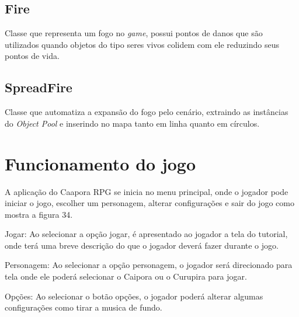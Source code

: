 \subsection{Fire}
Classe que representa um fogo no \textit{game}, possui pontos de danos que são utilizados quando objetos do tipo seres vivos colidem com ele reduzindo seus pontos de vida.


\subsection{SpreadFire}
Classe que automatiza a expansão do fogo pelo cenário, extraindo as instâncias do \textit{Object Pool} e inserindo no mapa tanto em linha quanto em círculos.

\section{Funcionamento do jogo}
A aplicação do Caapora RPG se inicia no menu principal, onde o jogador pode iniciar o jogo, escolher um personagem, alterar configurações e sair do jogo como mostra a figura 34.

\pagebreak
\begin{figure}[h!]
		\centering
	\end{figure}

Jogar: Ao selecionar a opção jogar, é apresentado ao jogador a tela do tutorial, onde terá uma breve descrição do que o jogador deverá fazer durante o jogo.

Personagem: Ao selecionar a opção personagem, o jogador será direcionado para tela onde ele poderá selecionar o Caipora ou o Curupira para jogar.

Opções: Ao selecionar o botão opções, o jogador poderá alterar algumas configurações como tirar a musica de fundo.

